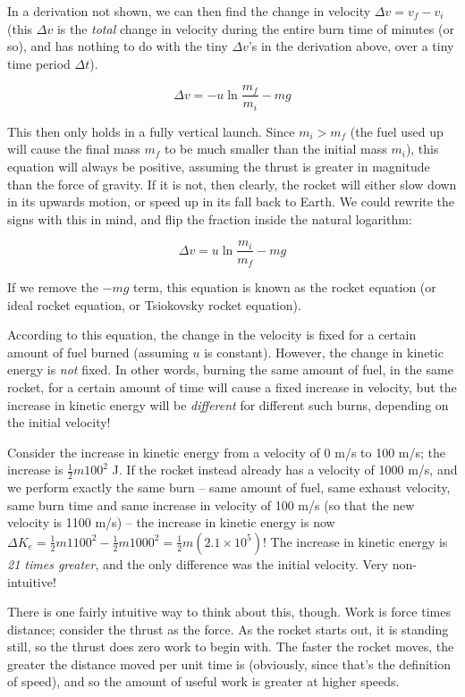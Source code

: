 In a derivation not shown, we can then find the change in velocity $\Delta v = v_f - v_i$ (this $\Delta v$ is the \emph{total} change in velocity during the entire burn time of minutes (or so), and has nothing to do with the tiny $\Delta v$'s in the derivation above, over a tiny time period $\Delta t$).

\begin{equation}
\Delta v = -u \ln \frac{m_f}{m_i} - m g
\end{equation}

This then only holds in a fully vertical launch. Since $m_i > m_f$ (the fuel used up will cause the final mass $m_f$ to be much smaller than the initial mass $m_i$), this equation will always be positive, assuming the thrust is greater in magnitude than the force of gravity. If it is not, then clearly, the rocket will either slow down in its upwards motion, or speed up in its fall back to Earth. We could rewrite the signs with this in mind, and flip the fraction inside the natural logarithm:

\begin{equation}
\Delta v = u \ln \frac{m_i}{m_f} - m g
\end{equation}

If we remove the $- m g$ term, this equation is known as the rocket equation (or ideal rocket equation, or Tsiokovsky rocket equation).

According to this equation, the change in the velocity is fixed for a certain amount of fuel burned (assuming $u$ is constant). However, the change in kinetic energy is \emph{not} fixed. In other words, burning the same amount of fuel, in the same rocket, for a certain amount of time will cause a fixed increase in velocity, but the increase in kinetic energy will be \emph{different} for different such burns, depending on the initial velocity!

Consider the increase in kinetic energy from a velocity of 0 m/s to 100 m/s; the increase is $\frac{1}{2} m 100^2$ J. If the rocket instead already has a velocity of 1000 m/s, and we perform exactly the same burn -- same amount of fuel, same exhaust velocity, same burn time and same increase in velocity of 100 m/s (so that the new velocity is 1100 m/s) -- the increase in kinetic energy is now $\Delta K_e = \frac{1}{2} m 1100^2 - \frac{1}{2} m 1000^2 = \frac{1}{2} m (2.1 \times 10^5)$! The increase in kinetic energy is \emph{21 times greater}, and the only difference was the initial velocity. Very non-intuitive!

There is one fairly intuitive way to think about this, though. Work is force times distance; consider the thrust as the force. As the rocket starts out, it is standing still, so the thrust does zero work to begin with. The faster the rocket moves, the greater the distance moved per unit time is (obviously, since that's the definition of speed), and so the amount of useful work is greater at higher speeds.

